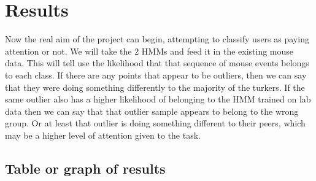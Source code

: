 \documentclass{article}
\begin{document}




\section{Results}

Now the real aim of the project can begin, attempting to classify users as paying attention or not.
We will take the 2 HMMs and feed it in the existing mouse data.
This will tell use the likelihood that that sequence of mouse events belongs to each class.
If there are any points that appear to be outliers, then we can say that they were doing something differently to the majority of the turkers.
If the same outlier also has a higher likelihood of belonging to the HMM trained on lab data then we can say that that outlier sample appears to belong to the wrong group.
Or at least that outlier is doing something different to their peers, which may be a higher level of attention given to the task. 


\subsection{Table or graph of results}
\end{document}
